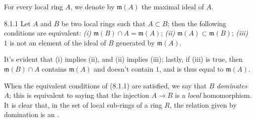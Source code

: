 \documentclass[../main.tex]{subfiles}
\begin{document}
For every local ring $A$, we denote by $\mathfrak{m}(A)$ the maximal ideal of $A$.

\begin{cx}[Lemma]{8.1.1}
    Let $A$ and $B$ be two local rings such that $A\subset B$; then the following conditions are equivalent: \emph{(i)} $\mathfrak{m}(B)\cap A=\mathfrak{m}(A)$; \emph{(ii)} $\mathfrak{m}(A)\subset\mathfrak{m}(B)$; \emph{(iii)} $1$ is not an element of the ideal of $B$ generated by $\mathfrak{m}(A)$.
\end{cx}

It's evident that (i) implies (ii), and (ii) implies (iii); lastly, if (iii) is true, then $\mathfrak{m}(B)\cap A$ contains $\mathfrak{m}(A)$ and doesn't contain $1$, and is thus equal to $\mathfrak{m}(A)$.

When the equivalent conditions of (8.1.1) are satisfied, we say that $B$ \emph{dominates} $A$; this is equivalent to saying that the injection $A\to B$ is a \emph{local} homomorphism.
It is clear that, in the set of local sub-rings of a ring $R$, the relation given by domination is an .

\end{document}
